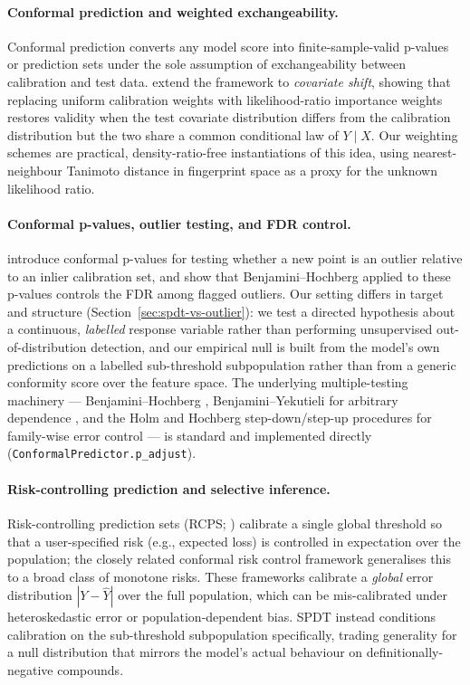 \documentclass[11pt]{article}
\begin{document}
\paragraph{Conformal prediction and weighted exchangeability.}
Conformal prediction \citep{vovk2005} converts any model score into
finite-sample-valid p-values or prediction sets under the sole assumption of
exchangeability between calibration and test data. \citet{tibshirani2019}
extend the framework to \emph{covariate shift}, showing that replacing uniform
calibration weights with likelihood-ratio importance weights restores validity
when the test covariate distribution differs from the calibration
distribution but the two share a common conditional law of $Y \mid X$. Our
weighting schemes are practical, density-ratio-free instantiations of this
idea, using nearest-neighbour Tanimoto distance in fingerprint space as a
proxy for the unknown likelihood ratio.

\paragraph{Conformal p-values, outlier testing, and FDR control.}
\citet{bates2023} introduce conformal p-values for testing whether a new
point is an outlier relative to an inlier calibration set, and show that
Benjamini--Hochberg applied to these p-values controls the FDR among
flagged outliers. Our setting differs in target and structure
(Section~\ref{sec:spdt-vs-outlier}): we test a directed hypothesis about a
continuous, \emph{labelled} response variable rather than performing
unsupervised out-of-distribution detection, and our empirical null is built
from the model's own predictions on a labelled sub-threshold subpopulation
rather than from a generic conformity score over the feature space. The
underlying multiple-testing machinery --- Benjamini--Hochberg \citep{benjamini1995},
Benjamini--Yekutieli for arbitrary dependence \citep{benjamini2001}, and the
Holm and Hochberg step-down/step-up procedures for family-wise error control
\citep{holm1979,hochberg1988} --- is standard and implemented directly
(\texttt{ConformalPredictor.p\_adjust}).

\paragraph{Risk-controlling prediction and selective inference.}
Risk-controlling prediction sets (RCPS; \citealp{bates2021}) calibrate a
single global threshold so that a user-specified risk (e.g., expected loss) is
controlled in expectation over the population; the closely related conformal
risk control framework \citep{angelopoulos2023} generalises this to a broad
class of monotone risks. These frameworks calibrate a \emph{global} error
distribution $|Y-\hat Y|$ over the full population, which can be
mis-calibrated under heteroskedastic error or population-dependent bias.
SPDT instead conditions calibration on the sub-threshold subpopulation
specifically, trading generality for a null distribution that mirrors the
model's actual behaviour on definitionally-negative compounds.
\end{document}
